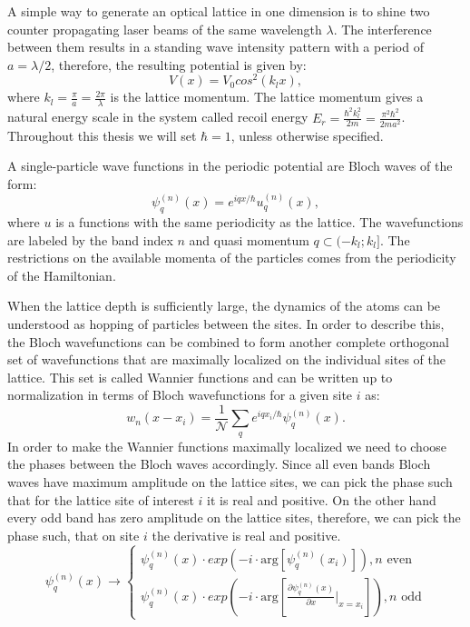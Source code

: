 A simple way to generate an optical lattice in one dimension is to shine two counter propagating laser beams of the same wavelength $\lambda$. The interference between them results in a standing wave intensity pattern with a period of $a=\lambda/2$, therefore, the resulting potential is given by:
\begin{equation}
V(x) = V_0cos^2(k_l x),
\end{equation}
where $k_l = \frac{\pi}{a} =\frac{2\pi}{\lambda}$ is the lattice momentum. The lattice momentum gives a natural energy scale in the system called recoil energy $E_r = \frac{\hbar^2 k_l^2}{2m} = \frac{\pi^2 \hbar^2}{2 m a^2}$. Throughout this thesis we will set $\hbar=1$, unless otherwise specified.

A single-particle wave functions in the periodic potential are Bloch waves of the form:
\begin{equation}
\psi^{(n)}_q (x) = e^{iqx/\hbar} u_q^{(n)} (x),
\end{equation}
where $u$ is a functions with the same periodicity as the lattice. The wavefunctions are labeled by the band index $n$ and quasi momentum $q \subset (-k_l; k_l]$. The restrictions on the available momenta of the particles comes from the periodicity of the Hamiltonian.

When the lattice depth is sufficiently large, the dynamics of the atoms can be understood as hopping of particles between the sites. In order to describe this, the Bloch wavefunctions can be combined to form another complete orthogonal set of wavefunctions that are maximally localized on the individual sites of the lattice. This set is called Wannier functions and can be written up to normalization in terms of Bloch wavefunctions for a given site $i$ as:
\begin{equation}
w_n(x-x_i) = \frac{1}{\mathcal{N}} \sum_q e^{iqx_i/\hbar} \psi_q^{(n)}(x).
\end{equation}
In order to make the Wannier functions maximally localized we need to choose the phases between the Bloch waves accordingly. Since all even bands Bloch waves have maximum amplitude on the lattice sites, we can pick the phase such that for the lattice site of interest $i$ it is real and positive. On the other hand every odd band has zero amplitude on the lattice sites, therefore, we can pick the phase such, that on site $i$ the derivative is real and positive.
\begin{equation}
\psi_q^{(n)}(x) \rightarrow
\begin{cases}
\psi_q^{(n)}(x) \cdot exp(-i \cdot \textrm{arg}[\psi_q^{(n)}(x_i)]), n \textrm{ even}\\
\psi_q^{(n)}(x) \cdot exp(-i \cdot  \textrm{arg}[\frac{\partial \psi_q^{(n)}(x)}{\partial x}|_{x=x_i}]), n \textrm{ odd}
\end{cases}
\end{equation}

